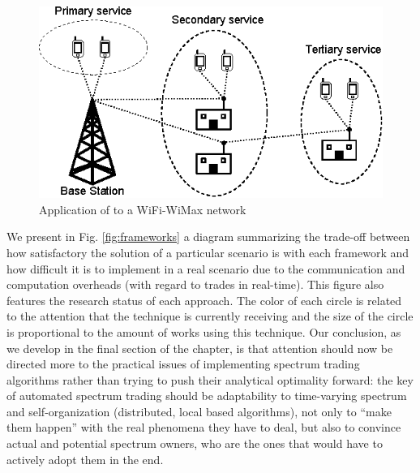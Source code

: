 \begin{figure}[ht]
	\begin{center}
  \includegraphics[scale=1]{Fig3.eps}
  \end{center}
  \caption{Application of \cite{ref:Niyato2010} to a WiFi-WiMax network}
   \label{fig:WiFi-WiMAX}
\end{figure}

We present in Fig. \ref{fig:frameworks} a diagram summarizing the trade-off between how satisfactory the solution of a particular scenario is with each framework and how difficult it is to implement in a real scenario due to the communication and computation overheads (with regard to trades in real-time). 
This figure also features the research status of each approach. 
The color of each circle is related to the attention that the technique is currently receiving and the size of the circle is proportional to the amount of works using this technique.
Our conclusion, as we develop in the final section of the chapter, is that attention should now be directed more to the practical issues of implementing spectrum trading algorithms rather than trying to push their analytical optimality forward: the key of automated spectrum trading should be adaptability to time-varying spectrum and self-organization (distributed, local based algorithms), not only to ``make them happen'' with the real phenomena they have to deal, but also to convince actual and potential spectrum owners, who are the ones that would have to actively adopt them in the end. 

